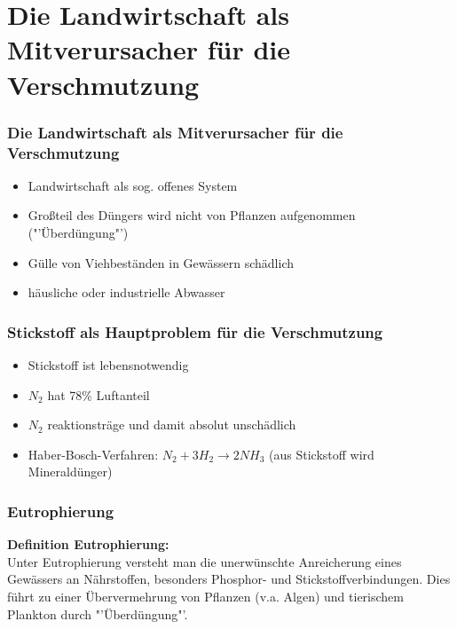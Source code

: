 \documentclass{beamer}
\begin{document}
	\section{Die Landwirtschaft als Mitverursacher für die Verschmutzung}
	\begin{frame}
		\frametitle{Die Landwirtschaft als Mitverursacher für die Verschmutzung}
		\LARGE
		
		\begin{itemize}
			\item Landwirtschaft als sog. offenes System
			
			\item Großteil des Düngers wird nicht von Pflanzen aufgenommen ("'Überdüngung"')
			
			\item Gülle von Viehbeständen in Gewässern schädlich
			
			\item häusliche oder industrielle Abwasser
		\end{itemize}
		
	\end{frame}
	
	\begin{frame}
		\frametitle{Stickstoff als Hauptproblem für die Verschmutzung}
		\LARGE
		
		\begin{itemize}
			\item Stickstoff ist lebensnotwendig
			
			\item $N_{2}$ hat 78\% Luftanteil
			
			\item $N_{2}$  reaktionsträge und damit absolut unschädlich
			
			\item Haber-Bosch-Verfahren: $N_{2} + 3H_{2} \rightarrow 2NH_{3}$ (aus Stickstoff wird Mineraldünger)
		\end{itemize}
				
	\end{frame}
	
	\begin{frame}
		\frametitle{Eutrophierung}
		\large
		
		\begin{mdframed}[style=zitat]
			\textbf{Definition Eutrophierung:} \\ 
			Unter Eutrophierung versteht man die unerwünschte Anreicherung eines Gewässers an Nährstoffen, besonders Phosphor- und Stickstoffverbindungen. Dies führt zu einer Übervermehrung von Pflanzen (v.a. Algen) und tierischem Plankton durch "'Überdüngung"'.%
		\end{mdframed}
		
		
	\end{frame}
	
\end{document}
